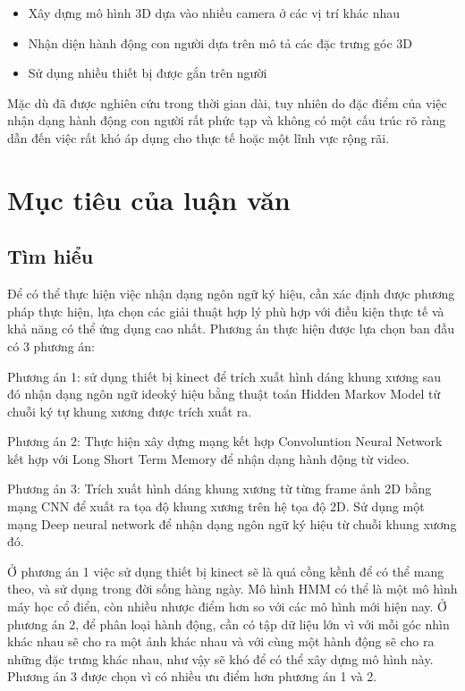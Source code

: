 \begin{itemize}
\item Xây dựng mô hình 3D dựa vào nhiều camera ở các vị trí khác nhau \cite{HLUT1}
\item Nhận diện hành động con người dựa trên mô tả các đặc trưng góc 3D \cite{6693448}
\item Sử dụng nhiều thiết bị được gắn trên người \cite{4650859}
\end{itemize}

Mặc dù đã được nghiên cứu trong thời gian dài, tuy nhiên do đặc điểm của việc nhận dạng hành động con người rất phức tạp và không có một cấu trúc rõ ràng dẫn đến việc rất khó áp dụng cho thực tế hoặc một lĩnh vực rộng rãi.

\section{Mục tiêu của luận văn}
\subsection{Tìm hiểu}
Để có thể thực hiện việc nhận dạng ngôn ngữ ký hiệu, cần xác định được phương pháp thực hiện, lựa chọn các giải thuật hợp lý phù hợp với điều kiện thực tế và khả năng có thể ứng dụng cao nhất.
Phương án thực hiện được lựa chọn ban đầu có 3 phương án: 

Phương án 1: sử dụng thiết bị kinect để trích xuất hình dáng khung xương sau đó nhận dạng ngôn ngữ ideoký hiệu bằng thuật toán Hidden Markov Model từ chuỗi ký tự khung xương được trích xuất ra.

Phương án 2: Thực hiện xây dựng mạng kết hợp Convoluntion Neural Network kết hợp với Long Short Term Memory để nhận dạng hành động từ video.

Phương án 3: Trích xuất hình dáng khung xương từ từng frame ảnh 2D bằng mạng CNN để xuất ra tọa độ khung xương trên hệ tọa độ 2D. Sử dụng một mạng Deep neural network để nhận dạng ngôn ngữ ký hiệu từ chuỗi khung xương đó.

Ở phương án 1 việc sử dụng thiết bị kinect sẽ là quá cồng kềnh để có thể mang theo, và sử dụng trong đời sống hàng ngày. Mô hình HMM có thể là một mô hình máy học cổ điển, còn nhiều nhược điểm hơn so với các mô hình mới hiện nay. Ở phương án 2, để phân loại hành động, cần có tập dữ liệu lớn vì với mỗi góc nhìn khác nhau sẽ cho ra một ảnh khác nhau và với cùng một hành động sẽ cho ra những đặc trưng khác nhau, như vậy sẽ khó để có thể xây dựng mô hình này. Phương án 3 được chọn vì có nhiều ưu điểm hơn phương án 1 và 2.

